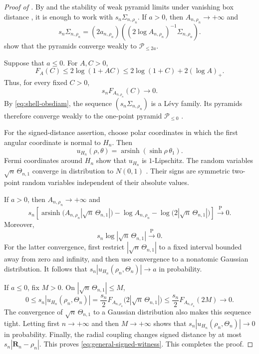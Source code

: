 \documentclass{amsart}
\numberwithin{equation}{section}
\theoremstyle{plain}
\theoremstyle{definition}
\theoremstyle{remark}
\DeclareMathOperator{\arsinh}{arsinh}
\begin{document}
\begin{proof}[Proof of ]
	By  and the stability of weak pyramid limits
	under vanishing box distance
	\cite[Proposition~5.5 and Theorem~6.25]{shioya2016mmg}, it is enough to
	work with $s_n\Sigma_{n,\rho_n}$.  If $a>0$, then
	$A_{n,\rho_n}\to+\infty$ and
	\[
		s_n\Sigma_{n,\rho_n}
		=
		(2a_{n,\rho_n})
		\left((2\log A_{n,\rho_n})^{-1}\Sigma_{n,\rho_n}\right).
	\]
	 show that
	the pyramids converge weakly to $\mathcal P_{\le2a}$.

	Suppose that $a\le0$.  For $A,C>0$,
\[ F_A(C) \le2\log(1+AC) \le2\log(1+C)+2(\log A)_+. \]
	Thus, for every fixed $C>0$,
	\[
		s_nF_{A_{n,\rho_n}}(C)\longrightarrow0.
	\]
	By \eqref{eq:shell-obsdiam}, the sequence
	$(s_n\Sigma_{n,\rho_n})$ is a L\'evy family.  Its pyramids therefore
	converge weakly to the one-point pyramid $\mathcal P_{\le0}$
	\cite[Corollary~5.8 and Theorem~6.25]{shioya2016mmg}.

	For the signed-distance assertion, choose polar coordinates in which the
	first angular coordinate is normal to $H_n$.
	Then
	\begin{equation}\label{eq:signed-distance-formula}
		u_{H_n}(\rho,\theta)=\arsinh(\sinh\rho\,\theta_1).
	\end{equation}
	Fermi coordinates around $H_n$ show that $u_{H_n}$ is $1$-Lipschitz.  The
	random variables $\sqrt n\,\Theta_{n,1}$ converge in distribution to
	$N(0,1)$ \cite[Proposition~2.1]{shioya2016mmg}.  Their signs are symmetric
	two-point random variables independent of their absolute values.

	If $a>0$, then $A_{n,\rho_n}\to+\infty$ and
	\[
		s_n\left[
		\arsinh\bigl(A_{n,\rho_n}|\sqrt n\,\Theta_{n,1}|\bigr)
		-\log A_{n,\rho_n}
		-\log\bigl(2|\sqrt n\,\Theta_{n,1}|\bigr)\right]
		\overset{\mathrm P}{\longrightarrow}0.
	\]
	Moreover,
\[ s_n\log|\sqrt n\,\Theta_{n,1}| \overset{\mathrm P}{\longrightarrow}0. \]
	For the latter convergence, first restrict
	$|\sqrt n\,\Theta_{n,1}|$ to a fixed interval bounded away from zero and
	infinity, and then use convergence to a nonatomic Gaussian
	distribution.  It follows that
	$s_n|u_{H_n}(\rho_n,\Theta_n)|\to a$ in probability.

	If $a\le0$, fix $M>0$.  On
	$|\sqrt n\,\Theta_{n,1}|\le M$,
	\[
		0\le s_n|u_{H_n}(\rho_n,\Theta_n)|
		=\frac{s_n}{2}F_{A_{n,\rho_n}}\bigl(2|\sqrt n\,\Theta_{n,1}|\bigr)
		\le\frac{s_n}{2}F_{A_{n,\rho_n}}(2M)\longrightarrow0.
	\]
	The convergence of $\sqrt n\,\Theta_{n,1}$ to a Gaussian distribution
	also makes this sequence tight.  Letting first $n\to+\infty$ and then
	$M\to+\infty$ shows that
	$s_n|u_{H_n}(\rho_n,\Theta_n)|\to0$ in probability.  Finally,
	the radial coupling changes signed distance by at most
	$s_n|\mathbf R_n-\rho_n|$.  This proves
	\eqref{eq:general-signed-witness}.
	This completes the proof.
\end{proof}
\end{document}
